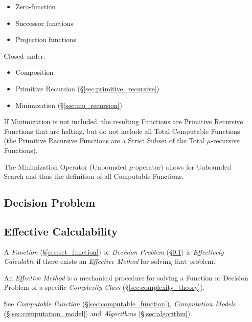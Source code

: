 \begin{itemize}
\item Zero-function
\item Successor functions
\item Projection functions
\end{itemize}

Closed under:

\begin{itemize}
\item Composition
\item Primitive Recursion (\S\ref{sec:primitive_recursive})
\item Minimization (\S\ref{sec:mu_recursion})
\end{itemize}

If Minimization is not included, the resulting Functions are Primitive
Recursive Functions that are halting, but do not include all Total
Computable Functions (the Primitive Recursive Functions are a Strict
Subset of the Total $\mu$-recursive Functions).

The Minimization Operator (Unbounded $\mu$-operator) allows for
Unbounded Search and thus the definition of all Computable Functions.



\subsection{Decision Problem}\label{sec:decision_problem}

\subsection{Effective Calculability}\label{sec:effective_method}

A \emph{Function} (\S\ref{sec:set_function}) or \emph{Decision
  Problem} (\S\ref{sec:decision_problem}) is \emph{Effectively
  Calculable} if there exists an \emph{Effective Method} for solving
that problem.

An \emph{Effective Method} is a mechanical procedure for solving a
Function or Decision Problem of a specific \emph{Complexity Class}
(\S\ref{sec:complexity_theory}).

See \emph{Computable Function} (\S\ref{sec:computable_function}),
\emph{Computation Models} (\S\ref{sec:computation_model}) and
\emph{Algorithms} (\S\ref{sec:algorithm}).

